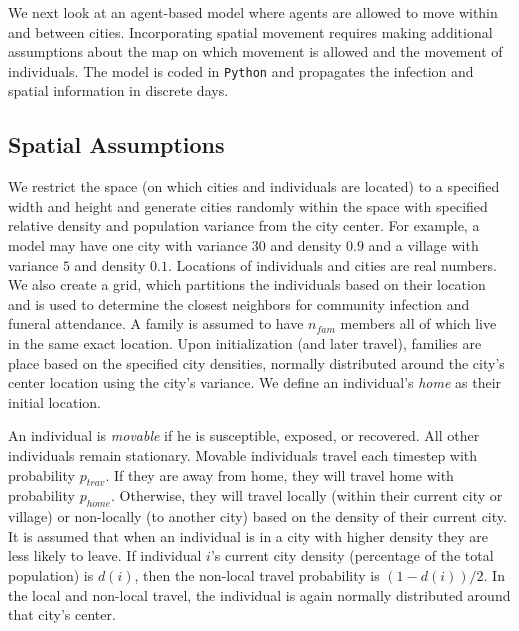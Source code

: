 
We next look at an agent-based model where agents are allowed to move within and between cities. Incorporating spatial movement requires making additional assumptions about the map on which movement is allowed and the movement of individuals. The model is coded in \texttt{Python} and propagates the infection and spatial information in discrete days. 

\subsection{Spatial Assumptions}
We restrict the space (on which cities and individuals are located) to a specified width and height and generate cities randomly within the space with specified relative density and population variance from the city center. For example, a model may have one city with variance $30$ and density $0.9$ and a village with variance $5$ and density $0.1$. Locations of individuals and cities are real numbers. We also create a grid, which partitions the individuals based on their location and is used to determine the closest neighbors for community infection and funeral attendance. A family is assumed to have $n_{fam}$ members all of which live in the same exact location. Upon initialization (and later travel), families are place based on the specified city densities, normally distributed around the city's center location using the city's variance. We define an individual's \emph{home} as their initial location.

An individual is \emph{movable} if he is susceptible, exposed, or recovered. All other individuals remain stationary. Movable individuals travel each timestep with probability $p_{trav}$. If they are away from home, they will travel home with probability $p_{home}$. Otherwise, they will travel locally (within their current city or village) or non-locally (to another city) based on the density of their current city. It is assumed that when an individual is in a city with higher density they are less likely to leave. If individual $i$'s current city density (percentage of the total population) is $d(i)$, then the non-local travel probability is $(1-d(i))/2$. In the local and non-local travel, the individual is again normally distributed around that city's center.

